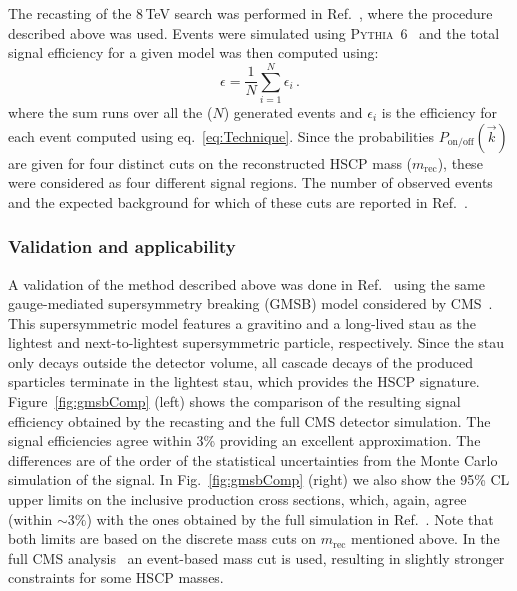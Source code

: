 The recasting of the 8\,TeV search was performed in Ref.~\cite{Heisig:2015yla},
where the procedure described above was used.
Events were simulated using \textsc{Pythia}~6~\cite{Sjostrand:2006za} and
the total signal efficiency for a given model was then computed using:
\begin{equation*}
\epsilon = \frac{1}{N} \sum_{i=1}^{N} \epsilon_i\,.
\end{equation*}
where the sum runs over all the ($N$) generated events and $\epsilon_i$ is the
efficiency for each event computed using eq.~\ref{eq:Technique}.
Since the probabilities $P_{\text{on/off}}(\vec{k})$ are given for 
four distinct cuts on the reconstructed HSCP mass ($m_\text{rec}$),
these were considered as four different signal regions.
The number of observed events and the expected background for which
of these cuts are reported in Ref.~\cite{Khachatryan:2015lla}.


\subsubsection{Validation and applicability} 
\label{sec:ch5-validate}

A validation of the method described above was 
done in Ref.~\cite{Heisig:2015yla} using the same gauge-mediated supersymmetry 
breaking (GMSB) model considered by CMS~\cite{Khachatryan:2015lla}.
This supersymmetric model features a gravitino and a long-lived stau as the lightest and next-to-lightest 
supersymmetric particle, respectively. 
Since the stau only decays outside the detector volume, all
cascade decays of the produced sparticles terminate in the lightest stau,
which provides the HSCP signature.
Figure~\ref{fig:gmsbComp} (left) shows the comparison of the resulting signal efficiency
obtained by the recasting and the full CMS detector 
simulation. The signal efficiencies agree within 3\% providing 
an excellent approximation. The differences are of the order of 
the statistical uncertainties from the Monte Carlo simulation of the signal.
In Fig.~\ref{fig:gmsbComp} (right) we also show the 95\% CL upper
limits on the inclusive production cross sections, which, again, agree 
(within $\sim 3\%$) with the ones obtained by the full simulation in 
Ref.~\cite{Khachatryan:2015lla}. 
Note that both limits are based on the discrete mass cuts on $m_\text{rec}$ mentioned
above. In the full CMS analysis~\cite{Chatrchyan:2013oca} an event-based
mass cut is used, resulting in slightly stronger constraints for some HSCP masses.

